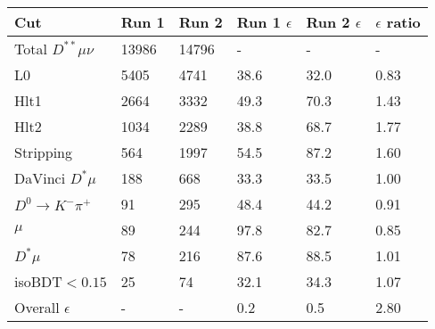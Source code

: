 \begin{tabular}{llllll}
\toprule
 Cut                       & Run 1   & Run 2   & Run 1 $\epsilon$   & Run 2 $\epsilon$   & $\epsilon$ ratio   \\
\midrule
 Total $D^{**}\mu\nu$      & 13986   & 14796   & -                  & -                  & -                  \\
 L0                        & 5405    & 4741    & 38.6               & 32.0               & 0.83               \\
 Hlt1                      & 2664    & 3332    & 49.3               & 70.3               & 1.43               \\
 Hlt2                      & 1034    & 2289    & 38.8               & 68.7               & 1.77               \\
 Stripping                 & 564     & 1997    & 54.5               & 87.2               & 1.60               \\
 DaVinci $D^* \mu$         & 188     & 668     & 33.3               & 33.5               & 1.00               \\
 $D^0\rightarrow K^-\pi^+$ & 91      & 295     & 48.4               & 44.2               & 0.91               \\
 $\mu$                     & 89      & 244     & 97.8               & 82.7               & 0.85               \\
 $D^* \mu$                 & 78      & 216     & 87.6               & 88.5               & 1.01               \\
 isoBDT$ < 0.15$           & 25      & 74      & 32.1               & 34.3               & 1.07               \\
 Overall $\epsilon$        & -       & -       & 0.2                & 0.5                & 2.80               \\
\bottomrule
\end{tabular}
